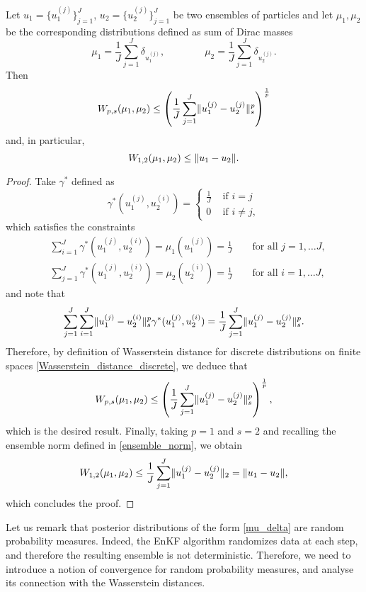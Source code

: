 \begin{lemma}
\label{Wasserstein_ensemble_norm}
Let $u_1 = \{ u_1^{(j)} \}_{j=1}^J$, $u_2 = \{ u_2^{(j)} \}_{j=1}^J$ be two ensembles of particles and let $\mu_1, \mu_2$ be the corresponding distributions defined as sum of Dirac masses
\begin{equation*}
\mu_1 = \frac{1}{J} \sum_{j=1}^J \delta_{u_1^{(j)}}, \qquad \qquad \mu_2 = \frac{1}{J} \sum_{j=1}^J \delta_{u_2^{(j)}}.
\end{equation*}
Then
\[ W_{p,s}(\mu_1, \mu_2) \le \left ( \frac{1}{J} \sum_{j=1}^J \lVert u_1^{(j)} - u_2^{(j)}\rVert_s^p \right )^{\frac{1}{p}} \]
and, in particular,
\[ W_{1,2}(\mu_1, \mu_2) \le \lVert u_1 - u_2\rVert. \]
\end{lemma}
\begin{proof}
Take $\gamma^*$ defined as
\begin{equation*}
\gamma^*(u_1^{(j)}, u_2^{(i)}) =
\begin{cases}
\frac{1}{J} & \text{ if } i = j \\
0 & \text{ if } i \neq j,
\end{cases}
\end{equation*}
which satisfies the constraints
\begin{align*}
& \sum_{i=1}^{J} \gamma^*(u_1^{(j)}, u_2^{(i)}) = \mu_1(u_1^{(j)}) = \frac{1}{J} \qquad \text{for all } j = 1, \dots J, \\
& \sum_{j=1}^{J} \gamma^*(u_1^{(j)}, u_2^{(i)}) = \mu_2(u_2^{(i)}) = \frac{1}{J} \qquad \text{for all } i = 1, \dots J,
\end{align*}
and note that
\begin{equation*}
\sum_{j=1}^{J} \sum_{i=1}^{J} \lVert u_1^{(j)} - u_2^{(i)}\rVert_s^p \gamma^*(u_1^{(j)}, u_2^{(i)}) = \frac{1}{J} \sum_{j=1}^{J} \lVert u_1^{(j)} - u_2^{(j)}\rVert_s^p.
\end{equation*}
Therefore, by definition of Wasserstein distance for discrete distributions on finite spaces \eqref{Wasserstein_distance_discrete}, we deduce that
\[ W_{p,s}(\mu_1, \mu_2) \le \left ( \frac{1}{J} \sum_{j=1}^J \lVert u_1^{(j)} - u_2^{(j)}\rVert_s^p \right )^{\frac{1}{p}}, \]
which is the desired result. Finally, taking $p = 1$ and $s = 2$ and recalling the ensemble norm defined in \eqref{ensemble_norm}, we obtain
\[ W_{1,2}(\mu_1, \mu_2) \le \frac{1}{J} \sum_{j=1}^J \lVert u_1^{(j)} - u_2^{(j)}\rVert_2 = \lVert u_1 - u_2\rVert, \]
which concludes the proof.
\end{proof}

Let us remark that posterior distributions of the form \eqref{mu_delta} are random probability measures. Indeed, the EnKF algorithm randomizes data at each step, and therefore the resulting ensemble is not deterministic. Therefore, we need to introduce a notion of convergence for random probability measures, and analyse its connection with the Wasserstein distances.

